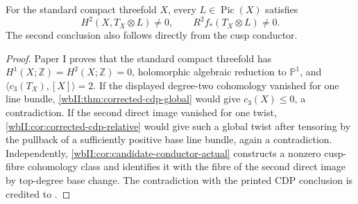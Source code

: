 \begin{corollary}
\label{wbII:test:cdp-comparison}
For the standard compact threefold $X$, every $L\in\operatorname{Pic}(X)$
satisfies
\[
 H^2(X,T_X\otimes L)\ne0,
 \qquad R^2f_*(T_X\otimes L)\ne0.
\]
The second conclusion also follows directly from the cusp conductor.
\end{corollary}
\begin{proof}
Paper I proves that the standard compact threefold has
$H^1(X;\mathbb Z)=H^2(X;\mathbb Z)=0$, holomorphic algebraic reduction
to $\mathbb P^1$, and $\langle c_3(T_X),[X]\rangle=2$.
If the displayed degree-two cohomology vanished for one line bundle,
\cref{wbII:thm:corrected-cdp-global} would give $c_3(X)\le0$, a contradiction.
If the second direct image vanished for one twist,
\cref{wbII:cor:corrected-cdp-relative} would give such a global twist after
tensoring by the pullback of a sufficiently positive base line bundle,
again a contradiction. Independently,
\cref{wbII:cor:candidate-conductor-actual} constructs a nonzero cusp-fibre
cohomology class and identifies it with the fibre of the second direct
image by top-degree base change. The contradiction with the printed
CDP conclusion is credited to \citet[Section~10.2, Theorem~10.5]{AC2026}.
\end{proof}
